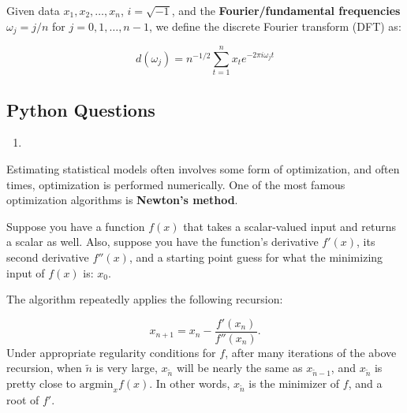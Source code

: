\documentclass[12pt,krantz2]{krantz}
\begin{document}
Given data \(x_1,x_2,\ldots,x_n\), \(i = \sqrt{-1}\), and the \textbf{Fourier/fundamental frequencies} \(\omega_j= j/n\) for \(j=0,1,\ldots,n-1\), we define the discrete Fourier transform (DFT) as:

\begin{equation} \label{eq:DFT}
d(\omega_j)= n^{-1/2} \sum_{t=1}^n x_t e^{-2 \pi i \omega_j t}
\end{equation}

\hypertarget{python-questions-4}{%
\subsection{Python Questions}\label{python-questions-4}}

\begin{enumerate}
\def\labelenumi{\arabic{enumi}.}
\item
\end{enumerate}

Estimating statistical models often involves some form of optimization, and often times, optimization is performed numerically. One of the most famous optimization algorithms is \textbf{Newton's method}.

Suppose you have a function \(f(x)\) that takes a scalar-valued input and returns a scalar as well. Also, suppose you have the function's derivative \(f'(x)\), its second derivative \(f''(x)\), and a starting point guess for what the minimizing input of \(f(x)\) is: \(x_0\).

The algorithm repeatedly applies the following recursion:

\begin{equation} 
x_{n+1} = x_{n} - \frac{f'(x_n)}{f''(x_{n})}.
\end{equation}
Under appropriate regularity conditions for \(f\), after many iterations of the above recursion, when \(\tilde{n}\) is very large, \(x_{\tilde{n}}\) will be nearly the same as \(x_{\tilde{n}-1}\), and \(x_{\tilde{n}}\) is pretty close to \(\text{argmin}_x f(x)\). In other words, \(x_{\tilde{n}}\) is the minimizer of \(f\), and a root of \(f'\).
\end{document}
